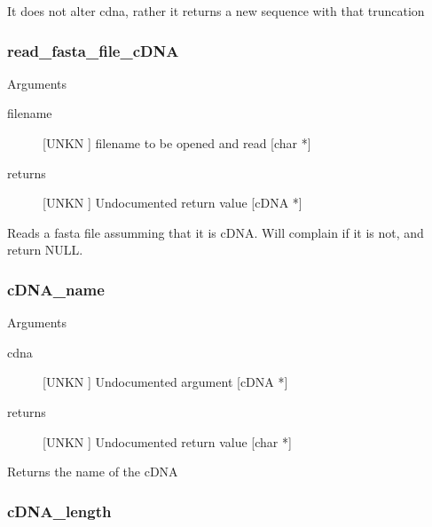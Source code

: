 It does not alter cdna, rather it returns a new
sequence with that truncation


\subsubsection{read_fasta_file_cDNA}

Arguments
\begin{description}
\item[filename] [UNKN ] filename to be opened and read [char *]
\item[returns] [UNKN ] Undocumented return value [cDNA *]
\end{description}
Reads a fasta file assumming that it is cDNA. 
Will complain if it is not, and return NULL.


\subsubsection{cDNA_name}

Arguments
\begin{description}
\item[cdna] [UNKN ] Undocumented argument [cDNA *]
\item[returns] [UNKN ] Undocumented return value [char *]
\end{description}
Returns the name of the cDNA


\subsubsection{cDNA_length}

